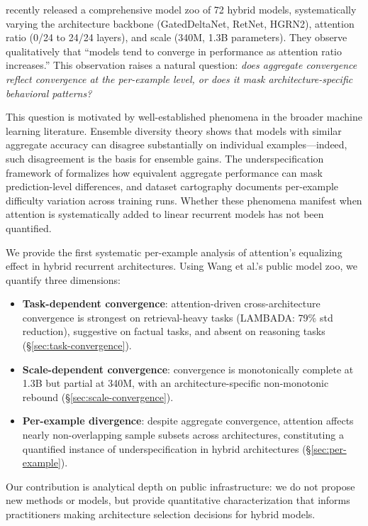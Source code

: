 \documentclass[11pt,twocolumn]{article}
\begin{document}
\citet{wang2025mamba} recently released a comprehensive model zoo of 72 hybrid models, systematically varying the architecture backbone (GatedDeltaNet, RetNet, HGRN2), attention ratio (0/24 to 24/24 layers), and scale (340M, 1.3B parameters).
They observe qualitatively that ``models tend to converge in performance as attention ratio increases.''
This observation raises a natural question: \emph{does aggregate convergence reflect convergence at the per-example level, or does it mask architecture-specific behavioral patterns?}

This question is motivated by well-established phenomena in the broader machine learning literature.
Ensemble diversity theory \citep{krogh1994neural,kuncheva2003measures} shows that models with similar aggregate accuracy can disagree substantially on individual examples---indeed, such disagreement is the basis for ensemble gains.
The underspecification framework of \citet{damour2022underspecification} formalizes how equivalent aggregate performance can mask prediction-level differences, and dataset cartography \citep{swayamdipta2020dataset} documents per-example difficulty variation across training runs.
Whether these phenomena manifest when attention is systematically added to linear recurrent models has not been quantified.

We provide the first systematic per-example analysis of attention's equalizing effect in hybrid recurrent architectures.
Using Wang et al.'s public model zoo, we quantify three dimensions:
\begin{itemize}
\setlength\itemsep{0.1em}
    \item \textbf{Task-dependent convergence}: attention-driven cross-architecture convergence is strongest on retrieval-heavy tasks (LAMBADA: 79\% std reduction), suggestive on factual tasks, and absent on reasoning tasks (\S\ref{sec:task-convergence}).
    \item \textbf{Scale-dependent convergence}: convergence is monotonically complete at 1.3B but partial at 340M, with an architecture-specific non-monotonic rebound (\S\ref{sec:scale-convergence}).
    \item \textbf{Per-example divergence}: despite aggregate convergence, attention affects nearly non-overlapping sample subsets across architectures, constituting a quantified instance of underspecification in hybrid architectures (\S\ref{sec:per-example}).
\end{itemize}

Our contribution is analytical depth on public infrastructure: we do not propose new methods or models, but provide quantitative characterization that informs practitioners making architecture selection decisions for hybrid models.
\end{document}
